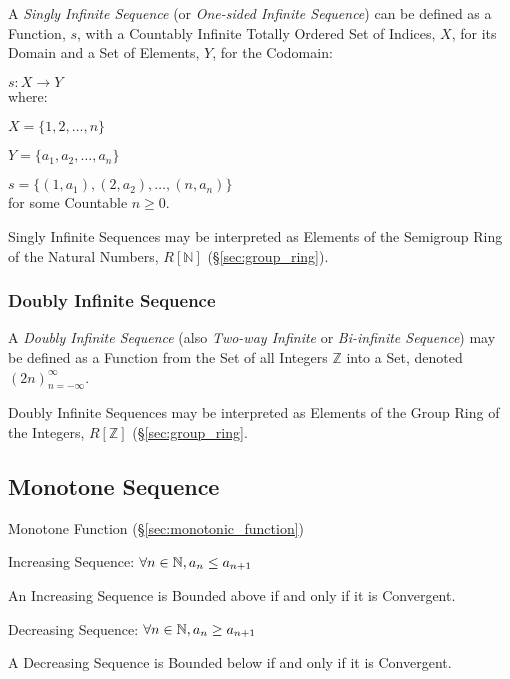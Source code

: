 A \emph{Singly Infinite Sequence} (or \emph{One-sided Infinite
  Sequence}) can be defined as a Function, $s$, with a Countably
Infinite Totally Ordered Set of Indices, $X$, for its Domain and a Set
of Elements, $Y$, for the Codomain:

  $s : X \rightarrow Y$ \\
where:

  $X = \{1,2,\ldots,n\}$

  $Y = \{a_1, a_2,\ldots,a_n\}$

  $s = \{(1,a_1), (2,a_2),\ldots, (n,a_n)\}$ \\
for some Countable $n \geq 0$.

Singly Infinite Sequences may be interpreted as Elements of the
Semigroup Ring of the Natural Numbers, $R[\mathbb{N}]$
(\S\ref{sec:group_ring}).



\subsubsection{Doubly Infinite Sequence}\label{sec:doubly_infinite}

A \emph{Doubly Infinite Sequence} (also \emph{Two-way Infinite} or
\emph{Bi-infinite Sequence}) may be defined as a Function from the Set
of all Integers $\mathbb{Z}$ into a Set, denoted
$(2n)^{\infty}_{n=-\infty}$.

Doubly Infinite Sequences may be interpreted as Elements of the Group
Ring of the Integers, $R[\mathbb{Z}]$ (\S\ref{sec:group_ring}.



\subsection{Monotone Sequence}\label{sec:monotone_sequence}

Monotone Function (\S\ref{sec:monotonic_function})

Increasing Sequence: $\forall n \in \mathbb{N}, a_n \leq a_{n+1}$

An Increasing Sequence is Bounded above if and only if it is
Convergent.

Decreasing Sequence: $\forall n \in \mathbb{N}, a_n \geq a_{n+1}$

A Decreasing Sequence is Bounded below if and only if it is
Convergent.



